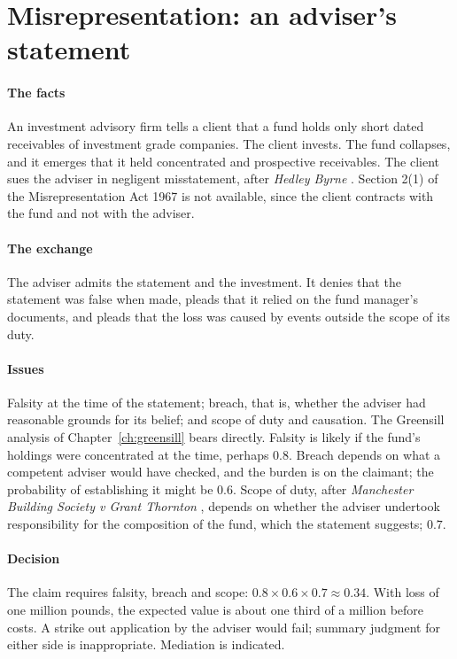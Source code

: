 \section{Misrepresentation: an adviser's statement}

\paragraph{The facts} An investment advisory firm tells a client that a fund holds only short dated receivables of investment grade companies. The client invests. The fund collapses, and it emerges that it held concentrated and prospective receivables. The client sues the adviser in negligent misstatement, after \emph{Hedley Byrne} \citep{hedleybyrne1964}. Section 2(1) of the Misrepresentation Act 1967 is not available, since the client contracts with the fund and not with the adviser.

\paragraph{The exchange} The adviser admits the statement and the investment. It denies that the statement was false when made, pleads that it relied on the fund manager's documents, and pleads that the loss was caused by events outside the scope of its duty.

\paragraph{Issues} Falsity at the time of the statement; breach, that is, whether the adviser had reasonable grounds for its belief; and scope of duty and causation. The Greensill analysis of Chapter~\ref{ch:greensill} bears directly. Falsity is likely if the fund's holdings were concentrated at the time, perhaps $0.8$. Breach depends on what a competent adviser would have checked, and the burden is on the claimant; the probability of establishing it might be $0.6$. Scope of duty, after \emph{Manchester Building Society v Grant Thornton} \citep{mbs2021}, depends on whether the adviser undertook responsibility for the composition of the fund, which the statement suggests; $0.7$.

\paragraph{Decision} The claim requires falsity, breach and scope: $0.8\times 0.6\times 0.7\approx 0.34$. With loss of one million pounds, the expected value is about one third of a million before costs. A strike out application by the adviser would fail; summary judgment for either side is inappropriate. Mediation is indicated.

